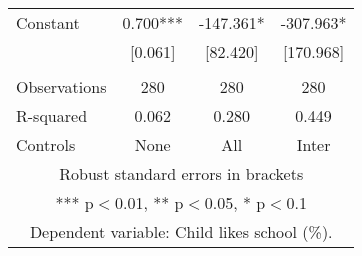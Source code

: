 \begin{tabular}{lccc}
Constant & 0.700*** & -147.361* & -307.963* \\
 & [0.061] & [82.420] & [170.968] \\
 &  &  &  \\
Observations & 280 & 280 & 280 \\
R-squared & 0.062 & 0.280 & 0.449 \\
 Controls & None & All & Inter \\ \hline
\multicolumn{4}{c}{ Robust standard errors in brackets} \\
\multicolumn{4}{c}{ *** p$<$0.01, ** p$<$0.05, * p$<$0.1} \\
\multicolumn{4}{c}{ Dependent variable: Child likes school (\%).} \\
\end{tabular}
